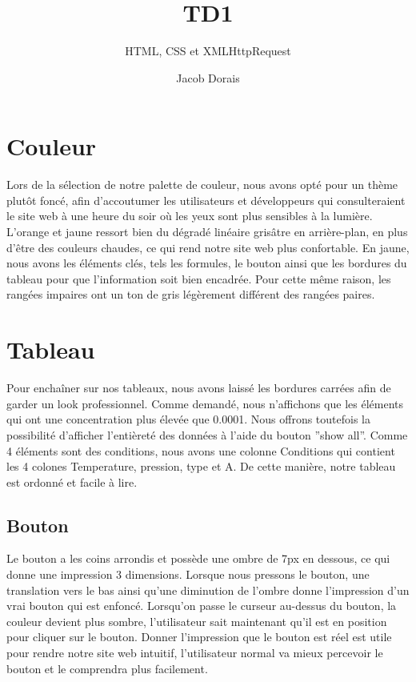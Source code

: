 \documentclass{article}
\title{TD1}
\subtitle{HTML, CSS et XMLHttpRequest}
\author{Jacob Dorais}{Billy Bouchard}{B1}
\begin{document}
\maketitle

\setlength{\parindent}{1cm}

\section{Couleur}

Lors de la sélection de notre palette de couleur,
nous avons opté pour un thème plutôt foncé, afin d'accoutumer
les utilisateurs et développeurs qui consulteraient
le site web à une heure du soir où les yeux sont plus sensibles à la lumière.
L’orange et jaune ressort bien du dégradé linéaire grisâtre en arrière-plan,
en plus d'être des couleurs chaudes, ce qui rend notre site web plus confortable.
En jaune, nous avons les éléments clés, tels les formules,
le bouton ainsi que les bordures du tableau pour que l'information soit bien encadrée.
Pour cette même raison, les rangées impaires ont un ton de gris légèrement différent des rangées paires.

\section{Tableau}

Pour enchaîner sur nos tableaux,
nous avons laissé les bordures carrées afin de garder un look professionnel.
Comme demandé, nous n'affichons que les éléments qui ont une concentration plus élevée que 0.0001.
Nous offrons toutefois la possibilité d'afficher l'entièreté des données à l'aide du bouton ''show all''.
Comme 4 éléments sont des conditions, nous avons une colonne Conditions
qui contient les 4 colones Temperature, pression, type et A.
De cette manière, notre tableau est ordonné et facile à lire.

\subsection{Bouton}

Le bouton a les coins arrondis et possède une ombre de 7px en dessous,
ce qui donne une impression 3 dimensions.
Lorsque nous pressons le bouton,
une translation vers le bas ainsi qu'une diminution de l'ombre donne
l'impression d'un vrai bouton qui est enfoncé.
Lorsqu'on passe le curseur au-dessus du bouton, la couleur devient plus sombre,
l'utilisateur sait maintenant qu'il est en position pour cliquer sur le bouton.
Donner l'impression que le bouton est réel est utile pour rendre notre site web intuitif,
l'utilisateur normal va mieux percevoir le bouton et le comprendra plus facilement.
\end{document}
